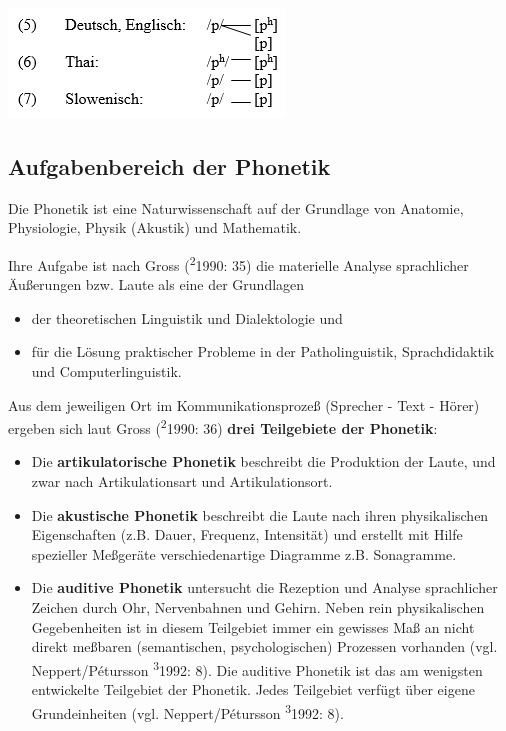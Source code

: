 \documentclass[
]{article}
\begin{document}
\includegraphics[width=0.3\linewidth]{pictures/01b_NSG_Intro_2020-10-07/phoneme_und_allophone2}

\hypertarget{aufgabenbereich-der-phonetik}{%
\subsection{Aufgabenbereich der Phonetik}\label{aufgabenbereich-der-phonetik}}

Die Phonetik ist eine Naturwissenschaft auf der Grundlage von Anatomie,
Physiologie, Physik (Akustik) und Mathematik.

Ihre Aufgabe ist nach Gross (\textsuperscript{2}1990: 35) die materielle Analyse
sprachlicher Äußerungen bzw. Laute als eine der Grundlagen

\begin{itemize}
\item
  der theoretischen Linguistik und Dialektologie und
\item
  für die Lösung praktischer Probleme in der Patholinguistik,
  Sprachdidaktik und Computerlinguistik.
\end{itemize}

Aus dem jeweiligen Ort im Kommunikationsprozeß (Sprecher - Text - Hörer)
ergeben sich laut Gross (\textsuperscript{2}1990: 36) \textbf{drei Teilgebiete der Phonetik}:

\begin{itemize}
\item
  Die \textbf{artikulatorische Phonetik} beschreibt die Produktion der
  Laute, und zwar nach Artikulationsart und Artikulationsort.
\item
  Die \textbf{akustische Phonetik} beschreibt die Laute nach ihren
  physikalischen Eigenschaften (z.B. Dauer, Frequenz, Intensität) und
  erstellt mit Hilfe spezieller Meßgeräte verschiedenartige Diagramme
  z.B. Sonagramme.
\item
  Die \textbf{auditive Phonetik} untersucht die Rezeption und Analyse
  sprachlicher Zeichen durch Ohr, Nervenbahnen und Gehirn. Neben rein
  physikalischen Gegebenheiten ist in diesem Teilgebiet immer ein
  gewisses Maß an nicht direkt meßbaren (semantischen,
  psychologischen) Prozessen vorhanden (vgl. Neppert/Pétursson
  \textsuperscript{3}1992: 8). Die auditive Phonetik ist das am wenigsten entwickelte
  Teilgebiet der Phonetik. Jedes Teilgebiet verfügt über eigene
  Grundeinheiten (vgl. Neppert/Pétursson \textsuperscript{3}1992: 8).
\end{itemize}
\end{document}
